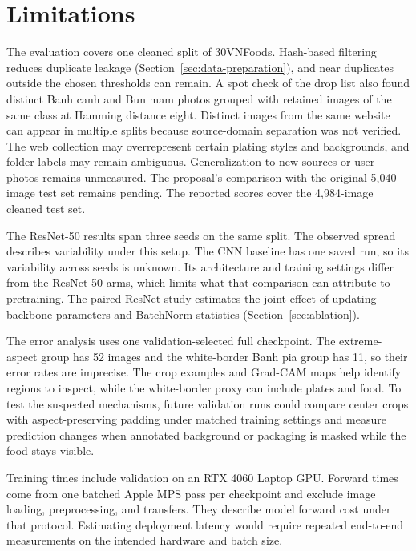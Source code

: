 \clearpage
\section{Limitations}
\label{sec:a2-limitations}

The evaluation covers one cleaned split of 30VNFoods. Hash-based filtering reduces duplicate leakage (Section~\ref{sec:data-preparation}), and near duplicates outside the chosen thresholds can remain. A spot check of the drop list also found distinct Banh canh and Bun mam photos grouped with retained images of the same class at Hamming distance eight. Distinct images from the same website can appear in multiple splits because source-domain separation was not verified. The web collection may overrepresent certain plating styles and backgrounds, and folder labels may remain ambiguous. Generalization to new sources or user photos remains unmeasured. The proposal's comparison with the original 5,040-image test set remains pending. The reported scores cover the 4,984-image cleaned test set.

The ResNet-50 results span three seeds on the same split. The observed spread describes variability under this setup. The CNN baseline has one saved run, so its variability across seeds is unknown. Its architecture and training settings differ from the ResNet-50 arms, which limits what that comparison can attribute to pretraining. The paired ResNet study estimates the joint effect of updating backbone parameters and BatchNorm statistics (Section~\ref{sec:ablation}).

The error analysis uses one validation-selected full checkpoint. The extreme-aspect group has 52 images and the white-border Banh pia group has 11, so their error rates are imprecise. The crop examples and Grad-CAM maps help identify regions to inspect, while the white-border proxy can include plates and food. To test the suspected mechanisms, future validation runs could compare center crops with aspect-preserving padding under matched training settings and measure prediction changes when annotated background or packaging is masked while the food stays visible.

Training times include validation on an RTX 4060 Laptop GPU. Forward times come from one batched Apple MPS pass per checkpoint and exclude image loading, preprocessing, and transfers. They describe model forward cost under that protocol. Estimating deployment latency would require repeated end-to-end measurements on the intended hardware and batch size.
